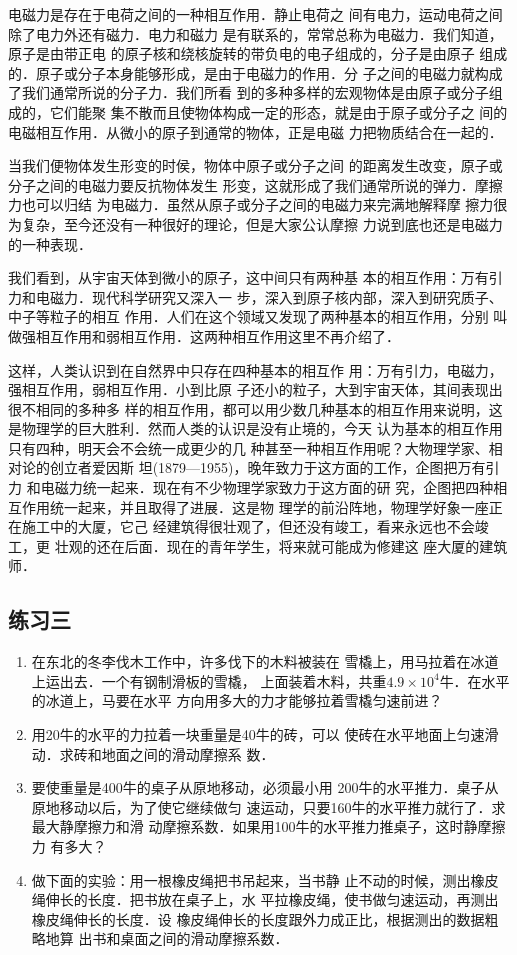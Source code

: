     电磁力是存在于电荷之间的一种相互作用．静止电荷之
间有电力，运动电荷之间除了电力外还有磁力．电力和磁力
是有联系的，常常总称为电磁力．我们知道，原子是由带正电
的原子核和绕核旋转的带负电的电子组成的，分子是由原子
组成的．原子或分子本身能够形成，是由于电磁力的作用．分
子之间的电磁力就构成了我们通常所说的分子力．我们所看
到的多种多样的宏观物体是由原子或分子组成的，它们能聚
集不散而且使物体构成一定的形态，就是由于原子或分子之
间的电磁相互作用．从微小的原子到通常的物体，正是电磁
力把物质结合在一起的．

    当我们便物体发生形变的时侯，物体中原子或分子之间
的距离发生改变，原子或分子之间的电磁力要反抗物体发生
形变，这就形成了我们通常所说的弹力．摩擦力也可以归结
为电磁力．虽然从原子或分子之间的电磁力来完满地解释摩
擦力很为复杂，至今还没有一种很好的理论，但是大家公认摩擦
力说到底也还是电磁力的一种表现．

    我们看到，从宇宙天体到微小的原子，这中间只有两种基
本的相互作用：万有引力和电磁力．现代科学研究又深入一
步，深入到原子核内部，深入到研究质子、中子等粒子的相互
作用．人们在这个领域又发现了两种基本的相互作用，分别
叫做强相互作用和弱相互作用．这两种相互作用这里不再介绍了．

    这样，人类认识到在自然界中只存在四种基本的相互作
用：万有引力，电磁力，强相互作用，弱相互作用．小到比原
子还小的粒子，大到宇宙天体，其间表现出很不相同的多种多
样的相互作用，都可以用少数几种基本的相互作用来说明，这
是物理学的巨大胜利．然而人类的认识是没有止境的，今天
认为基本的相互作用只有四种，明天会不会统一成更少的几
种甚至一种相互作用呢？大物理学家、相对论的创立者爱因斯
坦(1879—1955)，晚年致力于这方面的工作，企图把万有引力
和电磁力统一起来．现在有不少物理学家致力于这方面的研
究，企图把四种相互作用统一起来，并且取得了进展．这是物
理学的前沿阵地，物理学好象一座正在施工中的大厦，它己
经建筑得很壮观了，但还没有竣工，看来永远也不会竣工，更
壮观的还在后面．现在的青年学生，将来就可能成为修建这
座大厦的建筑师．

\subsection*{练习三}
\begin{enumerate}
\item  在东北的冬李伐木工作中，许多伐下的木料被装在
雪橇上，用马拉着在冰道上运出去．一个有钢制滑板的雪橇，
上面装着木料，共重$4.9\times 10^4$牛．在水平的冰道上，马要在水平
方向用多大的力才能够拉着雪橇匀速前进？

\item  用20牛的水平的力拉着一块重量是40牛的砖，可以
使砖在水平地面上匀速滑动．求砖和地面之间的滑动摩擦系
数．
\item  要使重量是400牛的桌子从原地移动，必须最小用
200牛的水平推力．桌子从原地移动以后，为了使它继续做匀
速运动，只要160牛的水平推力就行了．求最大静摩擦力和滑
动摩擦系数．如果用100牛的水平推力推桌子，这时静摩擦力
有多大？

\item  做下面的实验：用一根橡皮绳把书吊起来，当书静
止不动的时候，测出橡皮绳伸长的长度．把书放在桌子上，水
平拉橡皮绳，使书做匀速运动，再测出橡皮绳伸长的长度．设
橡皮绳伸长的长度跟外力成正比，根据测出的数据粗略地算
出书和桌面之间的滑动摩擦系数．
\end{enumerate}


